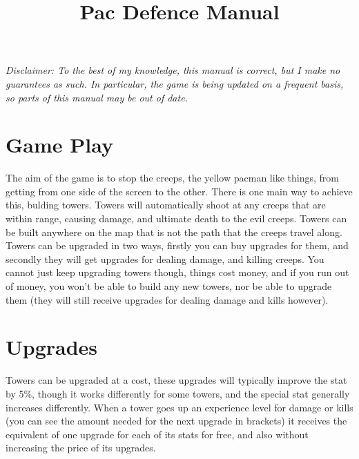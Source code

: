 \documentclass[a4paper,11pt]{article}
\title{Pac Defence Manual}
\begin{document}
\maketitle

\begin{center}
\begin{minipage}{12cm}
\begin{small}
\it
Disclaimer: To the best of my knowledge, this manual is correct, but I make no guarantees as such. In particular, the game is being updated on a frequent basis, so parts of this manual may be out of date.
\end{small}
\end{minipage}
\end{center}

\tableofcontents
\pagebreak

\setlength{\parskip}{4mm plus 2mm minus 1 mm}

\section{Game Play}
The aim of the game is to stop the creeps, the yellow pacman like things, from getting from one side of the screen to the other. There is one main way to achieve this, bulding towers. Towers will automatically shoot at any creeps that are within range, causing damage, and ultimate death to the evil creeps. Towers can be built anywhere on the map that is not the path that the creeps travel along. Towers can be upgraded in two ways, firstly you can buy upgrades for them, and secondly they will get upgrades for dealing damage, and killing creeps. You cannot just keep upgrading towers though, things cost money, and if you run out of money, you won't be able to build any new towers, nor be able to upgrade them (they will still receive upgrades for dealing damage and kills however).

\section{Upgrades}
Towers can be upgraded at a cost, these upgrades will typically improve the stat by 5\%, though it works differently for some towers, and the special stat generally increases differently. When a tower goes up an experience level for damage or kills (you can see the amount needed for the next upgrade in brackets) it receives the equivalent of one upgrade for each of its stats for free, and also without increasing the price of its upgrades.
\end{document}
